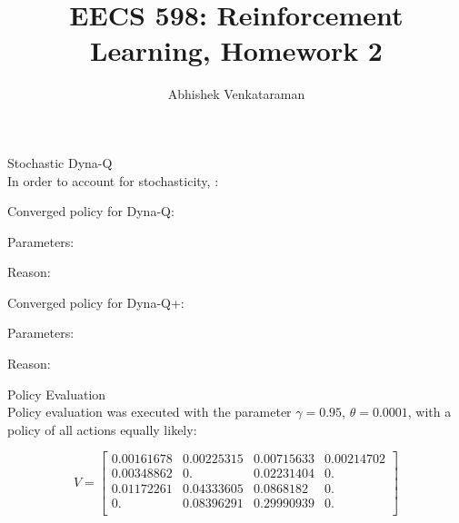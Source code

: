 \documentclass[12pt]{article}
\newenvironment{problem}[2][\large Problem]{\begin{trivlist}
\item[\hskip \labelsep {\bfseries #1}\hskip \labelsep {\bfseries #2.}]}{\end{trivlist}}
\begin{document}
 
 
 
\title{EECS 598: Reinforcement Learning, Homework 2}%
\author{Abhishek Venkataraman} %
 
\maketitle
 
\begin{problem} {1} Stochastic Dyna-Q
\\
In order to account for stochasticity, :

Converged policy for Dyna-Q:

Parameters:

Reason:

Converged policy for Dyna-Q+:

Parameters:

Reason:


\end{problem}


\begin{problem} {2} Policy Evaluation\\

Policy evaluation was executed with the parameter $\gamma = 0.95$, $\theta=0.0001$, with a policy of all actions equally likely:

$$ V = \begin{bmatrix} 
 0.00161678 & 0.00225315 & 0.00715633 & 0.00214702 \\
 0.00348862 & 0.       &   0.02231404 & 0.  \\
 0.01172261 & 0.04333605 & 0.0868182  & 0.  \\
 0.      &    0.08396291 & 0.29990939 & 0. \\
\end{bmatrix} $$ 
\end{problem}

\newpage
\end{document}
